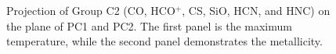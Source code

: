 \documentclass{aa}
\begin{document}
\begin{CJK*}{UTF8}{gbsn}
    \begin{figure}[htbp]
        \centering
        \caption{Projection of Group C2 (CO, HCO$^+$, CS, SiO, HCN, and HNC) on the plane of PC1 and PC2. The first panel is the maximum temperature, while the second panel demonstrates the metallicity.}
        \label{C2-12}
    \end{figure}


\end{CJK*}
\end{document}
